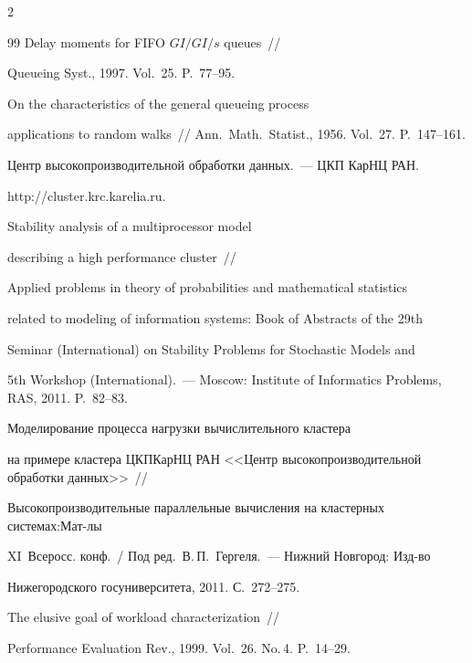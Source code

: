 \begin{multicols}{2}
{{\begin{thebibliography}{99}
 Delay moments for FIFO $GI/GI/s$ queues~// 

Queueing Syst., 1997. Vol.~25. P.~77--95.




 On the characteristics of the general queueing process 

applications to random walks~// Ann.~Math.~Statist., 1956. Vol.~27. P.~147--161.




Центр высокопроизводительной обработки данных.~--- ЦКП КарНЦ РАН.

{\sf http://cluster.krc.karelia.ru}.




 Stability analysis of a multiprocessor model 

describing a high performance cluster~// 

Applied problems in theory of probabilities and mathematical statistics 

related to modeling of information systems: Book of Abstracts of the 29th 

 Seminar (International) on Stability Problems for Stochastic Models and 

 5th Workshop (International).~--- Moscow: Institute of Informatics Problems, RAS, 2011. P.~82--83.




 Моделирование процесса нагрузки вычислительного кластера 

на примере кластера ЦКП\linebreak КарНЦ РАН <<Центр высокопроизводительной обработки данных>>~// 

Высокопроизводительные параллельные вычисления на кластерных системах:\linebreak Мат-лы 

XI~Всеросс. конф.~/ Под ред.~В.\,П.~Гергеля.~--- Нижний Новгород: Изд-во 

Нижегородского госуниверситета, 2011. С.~272--275.



\label{end\stat}




 The elusive goal of workload characterization~// 

Performance Evaluation Rev., 1999. Vol.~26. No.\,4. P.~14--29.

 \end{thebibliography}

}

}





\end{multicols}

